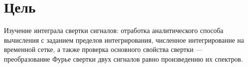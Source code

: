 \chapter*{Цель}

    Изучение интеграла свертки сигналов: отработка аналитического способа вычисления с заданием пределов интегрирования, численное интегрирование на временной сетке, а также проверка основного свойства свертки --- преобразование Фурье свертки двух сигналов равно произведению их спектров.

\endinput
